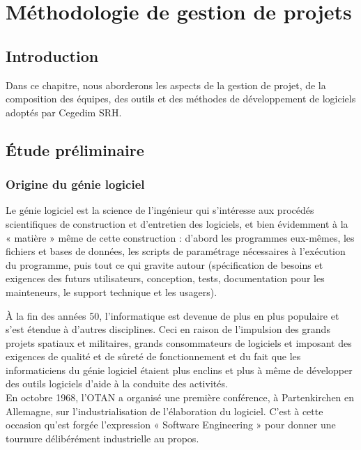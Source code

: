 \section{Méthodologie de gestion de projets}
\subsection*{Introduction}
Dans ce chapitre, nous aborderons les aspects de la gestion de projet, de la composition des équipes, des outils et des méthodes de développement de logiciels adoptés par Cegedim SRH.
\subsection{Étude préliminaire}
\subsubsection{Origine du génie logiciel}
\begin{beware}[title=Définition : ]
Le génie logiciel est la science de l'ingénieur qui s'intéresse aux procédés scientifiques de construction et d'entretien des logiciels, et bien évidemment à la « matière » même de cette construction : d'abord les programmes eux-mêmes, les fichiers et bases de données, les scripts de paramétrage nécessaires à l'exécution du programme, puis tout ce qui gravite autour (spécification de besoins et exigences des futurs utilisateurs, conception, tests, documentation pour les mainteneurs, le support technique et les usagers)\cite{origine_gl1}.
\end{beware}

À la fin des années 50, l’informatique est devenue de plus en plus populaire et s’est étendue à d’autres disciplines. Ceci en raison de l’impulsion des grands projets spatiaux et militaires, grands consommateurs de logiciels et imposant des exigences de qualité et de sûreté de fonctionnement et du fait que les informaticiens du génie logiciel étaient plus enclins et plus à même de développer des outils logiciels d’aide à la conduite des activités.\\

En octobre 1968, l'OTAN a organisé une première conférence, à Partenkirchen en Allemagne, sur l’industrialisation de l’élaboration du logiciel. C’est à cette occasion qu'est forgée l’expression « Software Engineering » pour donner une tournure délibérément industrielle au propos\cite{origine_gl3}.\\

